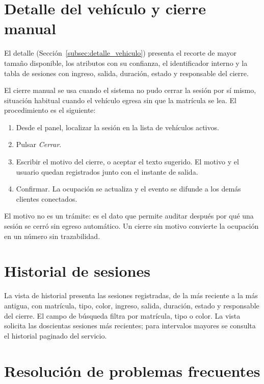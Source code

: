 \section{Detalle del vehículo y cierre manual}

El detalle (Sección~\ref{subsec:detalle_vehiculo}) presenta el recorte de mayor tamaño
disponible, los atributos con su confianza, el identificador interno y la tabla de
sesiones con ingreso, salida, duración, estado y responsable del cierre.

El cierre manual se usa cuando el sistema no pudo cerrar la sesión por sí mismo,
situación habitual cuando el vehículo egresa sin que la matrícula se lea. El
procedimiento es el siguiente:

\begin{enumerate}
    \item Desde el panel, localizar la sesión en la lista de vehículos activos.
    \item Pulsar \emph{Cerrar}.
    \item Escribir el motivo del cierre, o aceptar el texto sugerido. El motivo y
        el usuario quedan registrados junto con el instante de salida.
    \item Confirmar. La ocupación se actualiza y el evento se difunde a los demás
        clientes conectados.
\end{enumerate}

El motivo no es un trámite: es el dato que permite auditar después por qué una
sesión se cerró sin egreso automático. Un cierre sin motivo convierte la
ocupación en un número sin trazabilidad.

\section{Historial de sesiones}

La vista de historial presenta las sesiones registradas, de la más reciente a la
más antigua, con matrícula, tipo, color, ingreso, salida, duración, estado y
responsable del cierre. El campo de búsqueda filtra por matrícula, tipo o color.
La vista solicita las doscientas sesiones más recientes; para intervalos mayores
se consulta el historial paginado del servicio.

\section{Resolución de problemas frecuentes}

